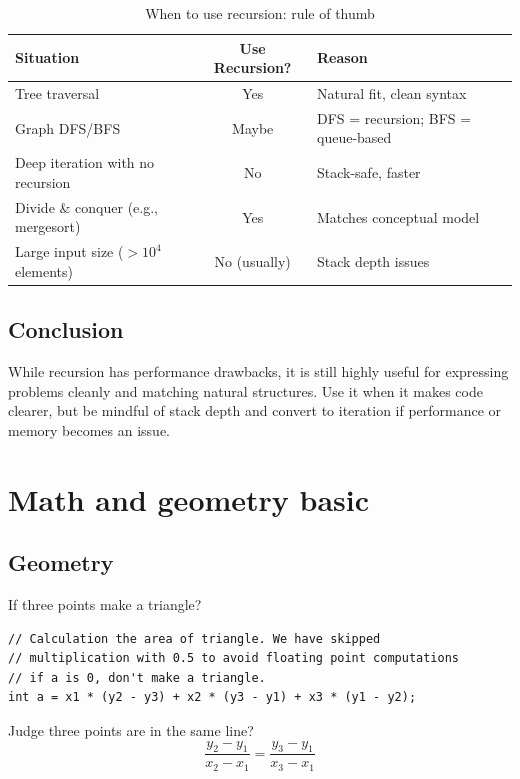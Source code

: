 \documentclass[a4paper,11pt,twoside]{book}
\begin{document}
\begin{table}[h!]
	\centering
	\begin{tabular}{|l|c|l|}
		\hline
		\textbf{Situation} & \textbf{Use Recursion?} & \textbf{Reason} \\
		\hline
		Tree traversal & Yes & Natural fit, clean syntax \\
		Graph DFS/BFS & Maybe & DFS = recursion; BFS = queue-based \\
		Deep iteration with no recursion & No & Stack-safe, faster \\
		Divide \& conquer (e.g., mergesort) & Yes & Matches conceptual model \\
		Large input size ($>10^4$ elements) & No (usually) & Stack depth issues \\
		\hline
	\end{tabular}
	\caption{When to use recursion: rule of thumb}
\end{table}

\subsection{Conclusion}

While recursion has performance drawbacks, it is still highly useful for expressing problems cleanly and matching natural structures. Use it when it makes code clearer, but be mindful of stack depth and convert to iteration if performance or memory becomes an issue.




\section{Math and geometry basic}
\subsection{Geometry}

	\par If three points make a triangle?
\begin{lstlisting}
// Calculation the area of triangle. We have skipped
// multiplication with 0.5 to avoid floating point computations
// if a is 0, don't make a triangle.
int a = x1 * (y2 - y3) + x2 * (y3 - y1) + x3 * (y1 - y2);
\end{lstlisting}

	\par Judge three points are in the same line?
\[
\dfrac{y_{2}-y_{1}}{x_{2}-x_{1}}  = \dfrac{y_{3}-y_{1}}{x_{3}-x_{1}}
\]
\end{document}
